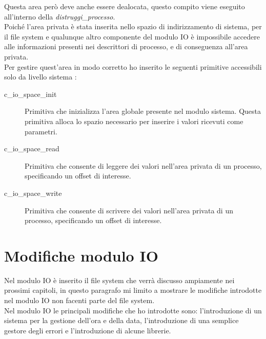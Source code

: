   Questa area però deve anche essere dealocata, questo compito viene eseguito all'interno della \textit{distruggi\_processo}.\\
  Poiché l'area privata è stata inserita nello spazio di indirizzamento di sistema, per il file system e qualunque altro componente del modulo IO è impossibile accedere alle informazioni presenti nei descrittori di processo, e di conseguenza all'area privata.\\ 
  Per gestire quest'area in modo corretto ho inserito le seguenti primitive accessibili solo da livello sistema : 
  \begin{description}
   \item[c\_io\_space\_init]
    Primitiva che inizializza l'area globale presente nel modulo sistema. Questa primitiva alloca lo spazio necessario per inserire i valori ricevuti come parametri. 
  \end{description}
  \begin{description}
   \item[c\_io\_space\_read]
   Primitiva che consente di leggere dei valori nell'area privata di un processo, specificando un offset di interesse.
  \end{description}
    \begin{description}
   \item[c\_io\_space\_write]
   Primitiva che consente di scrivere dei valori nell'area privata di un processo, specificando un offset di interesse.
  \end{description}

  
 \section{Modifiche modulo IO}
 Nel modulo IO è inserito il file system che verrà discusso ampiamente nei prossimi capitoli, in questo paragrafo mi limito a mostrare le modifiche introdotte nel modulo IO non facenti parte del file system. \\
 Nel modulo IO le principali modifiche che ho introdotte sono: l'introduzione di un sistema per la gestione dell'ora e della data, l'introduzione di una semplice gestore degli errori e l'introduzione di  alcune librerie.
